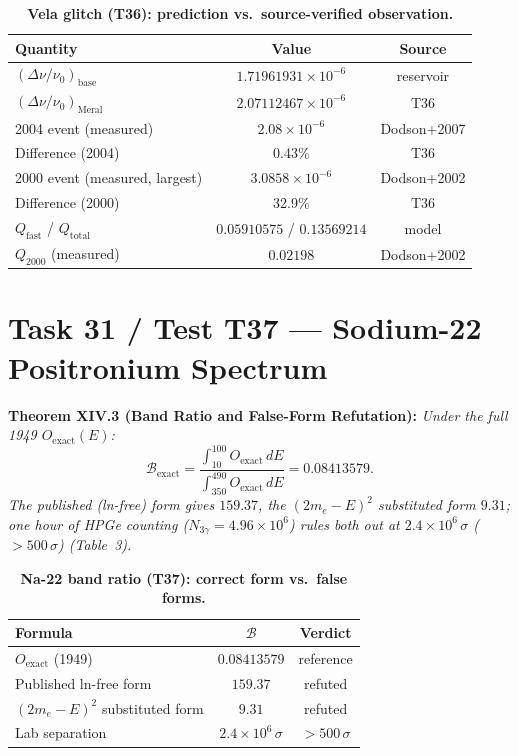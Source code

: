 \documentclass[12pt,a4paper]{article}
\begin{document}
\begin{table}[!htbp]
\centering\footnotesize
\setlength{\tabcolsep}{3pt}
\caption{\textbf{Vela glitch (T36): prediction vs.\ source-verified observation.}}
\label{tab:vela}
\vspace{0.1cm}
\begin{tabular}{@{}l|c|c@{}}
\toprule
Quantity & Value & Source \\
\midrule
$(\Delta\nu/\nu_0)_{\mathrm{base}}$ & $1.71961931\times 10^{-6}$ & reservoir \\
$(\Delta\nu/\nu_0)_{\mathrm{Meral}}$ & $2.07112467\times 10^{-6}$ & T36 \\
2004 event (measured) & $2.08\times 10^{-6}$ & Dodson+2007 \\
Difference (2004) & 0.43\% & T36 \\
2000 event (measured, largest) & $3.0858\times 10^{-6}$ & Dodson+2002 \\
Difference (2000) & 32.9\% & T36 \\
$Q_{\mathrm{fast}}$ / $Q_{\mathrm{total}}$ & $0.05910575$ / $0.13569214$ & model \\
$Q_{2000}$ (measured) & $0.02198$ & Dodson+2002 \\
\bottomrule
\end{tabular}
\end{table}

\section{Task 31 / Test T37 --- Sodium-22 Positronium Spectrum}

\textbf{Theorem XIV.3 (Band Ratio and False-Form Refutation):}
\textit{Under the full 1949 $O_{\mathrm{exact}}(E)$:}
\begin{equation}
\boxed{\mathcal{B}_{\mathrm{exact}}
=\frac{\int_{10}^{100}O_{\mathrm{exact}}\,dE}
{\int_{350}^{490}O_{\mathrm{exact}}\,dE}=0.08413579.}
\end{equation}
\textit{The published (ln-free) form gives $159.37$, the $(2m_e-E)^2$
substituted form $9.31$; one hour of HPGe counting ($N_{3\gamma}=4.96\times
10^6$) rules both out at $2.4\times 10^6\,\sigma$ ($>500\,\sigma$) (Table~3).}

\begin{table}[!htbp]
\centering\footnotesize
\setlength{\tabcolsep}{3pt}
\caption{\textbf{Na-22 band ratio (T37): correct form vs.\ false forms.}}
\label{tab:na22}
\vspace{0.1cm}
\begin{tabular}{@{}l|c|c@{}}
\toprule
Formula & $\mathcal{B}$ & Verdict \\
\midrule
$O_{\mathrm{exact}}$ (1949) & $0.08413579$ & reference \\
Published ln-free form & $159.37$ & refuted \\
$(2m_e-E)^2$ substituted form & $9.31$ & refuted \\
Lab separation & $2.4\times 10^6\,\sigma$ & $>500\,\sigma$ \\
\bottomrule
\end{tabular}
\end{table}
\end{document}
